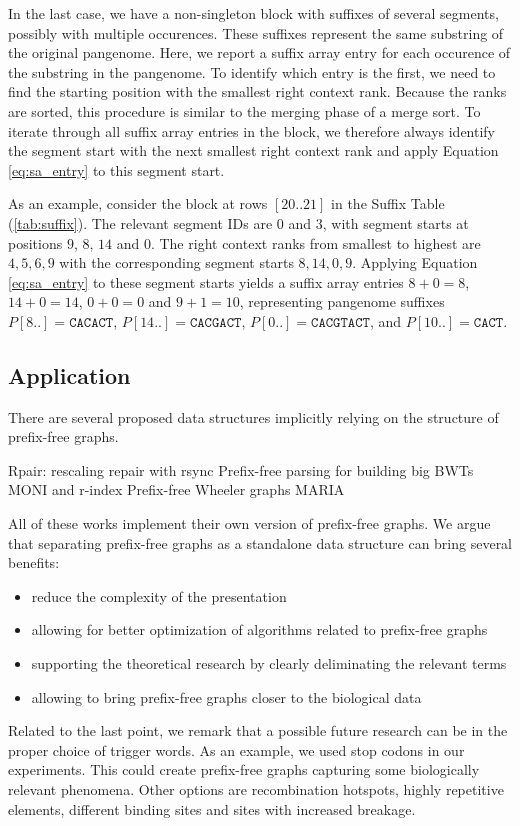 In the last case, we have a non-singleton block with suffixes of several segments, possibly with multiple occurences.
These suffixes represent the same substring of the original pangenome.
Here, we report a suffix array entry for each occurence of the substring in the pangenome.
To identify which entry is the first, we need to find the starting position with the smallest right context rank.
Because the ranks are sorted, this procedure is similar to the merging phase of a merge sort.
To iterate through all suffix array entries in the block, we therefore always identify the segment start with the next smallest right context rank and apply Equation \ref{eq:sa_entry} to this segment start.

As an example, consider the block at rows $[20..21]$ in the Suffix Table (\ref{tab:suffix}).
The relevant segment IDs are $0$ and $3$, with segment starts at positions $9$, $8$, $14$ and $0$.
The right context ranks from smallest to highest are $4, 5, 6, 9$ with the corresponding segment starts $8, 14, 0, 9$.
Applying Equation \ref{eq:sa_entry} to these segment starts yields a suffix array entries $8 + 0 = 8$, $14 + 0 = 14$, $0 + 0 = 0$ and $9 + 1 = 10$, representing pangenome suffixes $P[8..] = \texttt{CACACT}$, $P[14..] = \texttt{CACGACT}$, $P[0..] = \texttt{CACGTACT}$, and $P[10..] = \texttt{CACT}$.

\subsection{Application}
There are several proposed data structures implicitly relying on the structure
of prefix-free graphs.

Rpair: rescaling repair with rsync \cite{2019gagie}
Prefix-free parsing for building big BWTs \cite{2019boucher}
MONI and r-index \cite{rossi2022moni,gagie2020fully}
Prefix-free Wheeler graphs \cite{2022pfwg}
MARIA \cite{2022maria}

All of these works implement their own version of prefix-free graphs.
We argue that separating prefix-free graphs as a standalone data structure can
bring several benefits:

\begin{itemize}
    \item reduce the complexity of the presentation
    \item allowing for better optimization of algorithms related to prefix-free graphs
    \item supporting the theoretical research by clearly deliminating the relevant terms
    \item allowing to bring prefix-free graphs closer to the biological data
\end{itemize}

Related to the last point, we remark that a possible future research can be in
the proper choice of trigger words.
As an example, we used stop codons in our experiments.
This could create prefix-free graphs capturing some biologically relevant phenomena.
Other options are recombination hotspots, highly repetitive elements, different
binding sites and sites with increased breakage.


